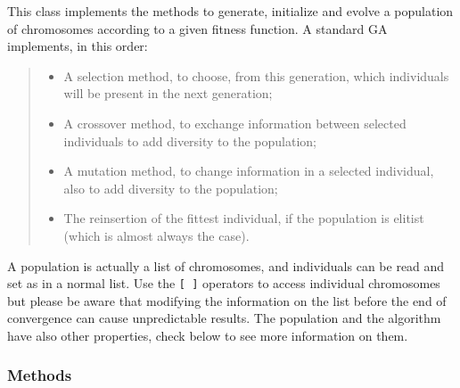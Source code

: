 This class implements the methods to generate, initialize and evolve a
population of chromosomes according to a given fitness function. A standard
GA implements, in this order:
%
\begin{quote}
%
\begin{itemize}

\item A selection method, to choose, from this generation, which individuals
will be present in the next generation;

\item A crossover method, to exchange information between selected individuals
to add diversity to the population;

\item A mutation method, to change information in a selected individual, also
to add diversity to the population;

\item The reinsertion of the fittest individual, if the population is elitist
(which is almost always the case).

\end{itemize}

\end{quote}

A population is actually a list of chromosomes, and individuals can be
read and set as in a normal list. Use the \texttt{{[} {]}} operators to access
individual chromosomes but please be aware that modifying the information on
the list before the end of convergence can cause unpredictable results. The
population and the algorithm have also other properties, check below to see
more information on them.


  \subsubsection{Methods}

    \vspace{0.5ex}

